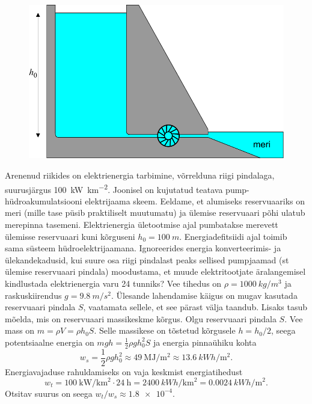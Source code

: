 
\begin{figure}
    \vspace{-10pt}
	\includegraphics[width=\linewidth]{2019-lahg-02-yl.pdf}
\end{figure}

Arenenud riikides on elektrienergia tarbimine, võrrelduna riigi pindalaga, suurusjärgus \SI{100}{\kilo\watt\per\kilo\meter\squared}. Joonisel on kujutatud teatava pump-hüdroakumulatsiooni elektrijaama skeem. Eeldame, et alumiseks reservuaariks on meri (mille tase püsib praktiliselt muutumatu) ja ülemise reservuaari põhi ulatub merepinna tasemeni. Elektrienergia ületootmise ajal pumbatakse merevett ülemisse reservuaari kuni kõrguseni $h_0=\SI{100}{m}$. Energiadefitsiidi ajal toimib sama süsteem hüdroelektrijaamana. Ignoreerides energia konverteerimis- ja ülekandekadusid, kui suure osa riigi pindalast peaks sellised pumpjaamad (st ülemise reservuaari pindala) moodustama, et muude elektritootjate äralangemisel kindlustada elektrienergia varu 24 tunniks? Vee tihedus on $\rho=\SI{1000}{kg/m^3}$ ja raskuskiirendus $g=\SI{9.8}{m/s^2}$.\hint
Ülesande lahendamise käigus on mugav kasutada reservuaari pindala $S$, vaatamata sellele, et see pärast välja taandub. Lisaks tasub mõelda, mis on reservuaari massikeskme kõrgus.\solu
Olgu reservuaari pindala $S$. Vee mass on $m=\rho V=\rho h_0S$. Selle massikese on tõstetud kõrgusele $h=h_0/2$, seega potentsiaalne energia on $mgh=\frac{1}{2}\rho gh_0^2S$ ja energia pinnaühiku kohta
\[
w_s=\frac{1}{2}\rho gh_0^2\approx \SI{49}{\mega\joule\per\meter\squared}\approx\SI{13.6}{kWh\per\meter\squared}.
\]
Energiavajaduse rahuldamiseks on vaja keskmist energiatihedust
\[
w_t=\SI{100}{\kilo\watt\per\kilo\meter\squared}\cdot \SI{24}{\hour}=\SI{2400}{kWh\per\kilo\meter\squared}=\SI{0.0024}{kWh\per\meter\squared}.
\]
Otsitav suurus on seega $w_t/w_s\approx \num{1.8e-4}$.\probend